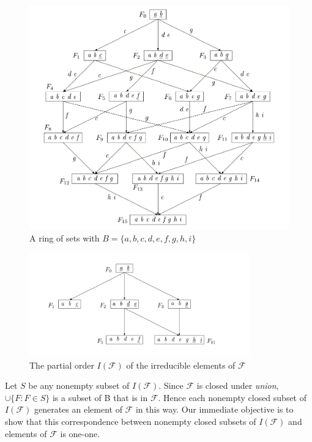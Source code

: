 \begin{figure}[ht]
  \centering
  \includegraphics[width=1\textwidth]{IMAGES_FIGS/FIG_2_4.png}
  \caption{A ring of sets with $B = \{a, b, c, d, e, f, g, h, i\}$}
  \label{FIG_2_5}
\end{figure}

\begin{figure}[ht]
  \centering
  \includegraphics[width=0.85\textwidth]{IMAGES_FIGS/FIG_2_5.png}
  \caption{The partial order $I(\mathcal{F})$ of the irreducible elements of $\mathcal{F}$}
  \label{FIG_2_6}
\end{figure}

Let $S$ be any nonempty subset of $I(\mathcal{F})$. Since $\mathcal{F}$ is closed under \textit{union}, $\cup\{F : F \in S\}$ is a subset of B that is in $\mathcal{F}$. Hence each nonempty closed subset of $I(\mathcal{F})$ generates an element of $\mathcal{F}$ in this way. Our immediate objective is to show that this correspondence between nonempty closed subsets of $I(\mathcal{F})$ and elements of $\mathcal{F}$ is one-one.

